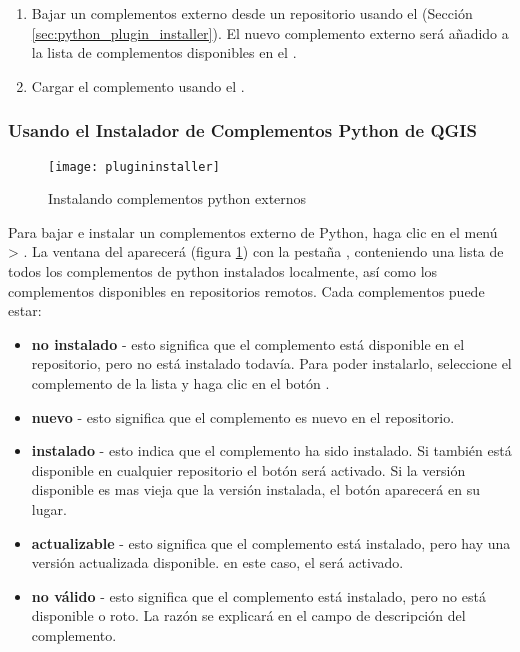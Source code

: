 \begin{enumerate}
\item Bajar un complementos externo desde un repositorio usando el  (Sección \ref{sec:python_plugin_installer}).
El nuevo complemento externo será añadido a la lista de complementos disponibles en el .
\item Cargar el complemento usando el .
\end{enumerate}

\subsubsection{Usando el Instalador de Complementos Python de QGIS}\label{sec:python_plugin_installer}

\begin{figure}[ht]
   \begin{center}
   \caption{Instalando complementos python externos \nixcaption}
\label{fig:plugininstaller}\smallskip
   \texttt{[image: plugininstaller]}
\end{center}
\end{figure}

Para bajar e instalar un complementos externo de Python, haga clic en el menú  > .
La ventana del  aparecerá (figura \ref{fig:plugininstaller}) con la pestaña , conteniendo una lista de todos los complementos de python instalados localmente, así como los complementos disponibles en repositorios remotos. Cada complementos puede estar:
\begin{itemize}
\item \textbf{no instalado} - esto significa que el complemento está disponible en el repositorio, pero no está instalado todavía. Para poder instalarlo, seleccione el complemento de la lista y haga clic en el botón .
\item \textbf{nuevo} - esto significa que el complemento es nuevo en el repositorio.
\item \textbf{instalado} - esto indica que el complemento ha sido instalado. Si también está disponible en cualquier repositorio el botón  será activado. Si la versión disponible es mas vieja que la versión instalada, el botón  aparecerá en su lugar.
\item \textbf{actualizable} - esto significa que el complemento está instalado, pero hay una versión actualizada disponible. en este caso, el   será activado.
\item \textbf{no válido} - esto significa que el complemento está instalado, pero no está disponible o roto. La razón se explicará en el campo de descripción del complemento.
\end{itemize}

